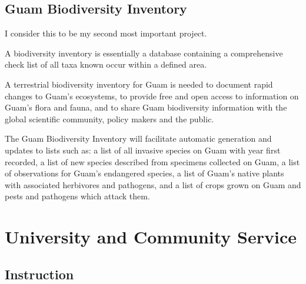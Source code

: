 \documentclass[12pt,english]{scrartcl}
\begin{document}
\subsection{Guam Biodiversity Inventory}

I consider this to be my second most important project.

A biodiversity inventory is essentially a database containing a comprehensive
check list of all taxa known occur within a defined area.

A terrestrial biodiversity inventory for Guam is needed to document
rapid changes to Guam\textquoteright s ecosystems, to provide free
and open access to information on Guam\textquoteright s flora and
fauna, and to share Guam biodiversity information with the global
scientific community, policy makers and the public.

The Guam Biodiversity Inventory will facilitate automatic generation
and updates to lists such as: a list of all invasive species on Guam
with year first recorded, a list of new species described from specimens
collected on Guam, a list of observations for Guam\textquoteright s
endangered species, a list of Guam\textquoteright s native plants
with associated herbivores and pathogens, and a list of crops grown
on Guam and pests and pathogens which attack them.

\begin{comment}
\raggedright\vspace{2mm}\textbf{Activity}
\begin{itemize}
\item I made a couple of presentations on my plans for the Guam Biodiversity
Inventory \cite{moore2018building2,moore2018building}.
\item I designed data model for the Guam Biodiversity Inventory and created
a prototype web site.
\end{itemize}
\raggedright\vspace{2mm}\textbf{Reference(s)}

\begin{btSect}[vancouver]{zotero}
\btPrintCited
\end{btSect}
\end{comment}

\pagebreak

\section{University and Community Service}

\subsection{Instruction}
\end{document}
